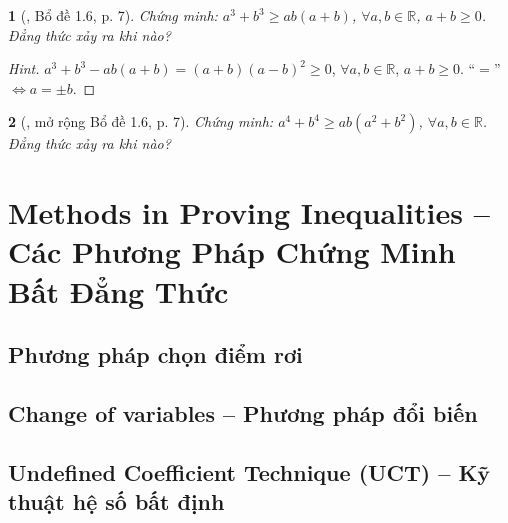\documentclass{article}
\newtheorem{baitoan}{}
\begin{document}
\begin{baitoan}[\cite{Son_Nghiep_Trung_Can_bdt}, Bổ đề 1.6, p. 7]
	Chứng minh: $a^3 + b^3\ge ab(a + b)$, $\forall a,b\in\mathbb{R}$, $a + b\ge 0$. Đẳng thức xảy ra khi nào?
\end{baitoan}

\begin{proof}[Hint]
	$a^3 + b^3 - ab(a + b) = (a + b)(a - b)^2\ge 0$, $\forall a,b\in\mathbb{R}$, $a + b\ge 0$. ``$=$'' $\Leftrightarrow a = \pm b$.
\end{proof}

\begin{baitoan}[\cite{Son_Nghiep_Trung_Can_bdt}, mở rộng Bổ đề 1.6, p. 7]
	Chứng minh: $a^4 + b^4\ge ab(a^2 + b^2)$, $\forall a,b\in\mathbb{R}$. Đẳng thức xảy ra khi nào?
\end{baitoan}


\section{Methods in Proving Inequalities -- Các Phương Pháp Chứng Minh Bất Đẳng Thức}

\subsection{Phương pháp chọn điểm rơi}

\subsection{Change of variables -- Phương pháp đổi biến}

\subsection{Undefined Coefficient Technique (UCT) -- Kỹ thuật hệ số bất định}
\end{document}
